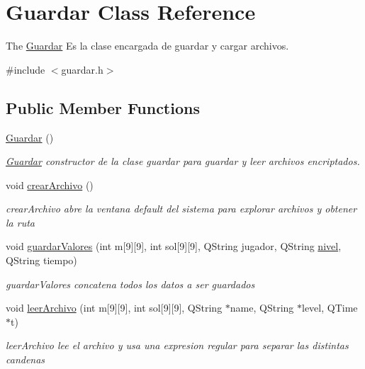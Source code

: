 \hypertarget{class_guardar}{\section{Guardar Class Reference}
\label{class_guardar}
}


The \hyperlink{class_guardar}{Guardar} Es la clase encargada de guardar y cargar archivos.  




{\ttfamily \#include $<$guardar.\-h$>$}

\subsection*{Public Member Functions}
\begin{DoxyCompactItemize}
\item 
\hypertarget{class_guardar_a265efa37b91672b6040a27f2207192b7}{\hyperlink{class_guardar_a265efa37b91672b6040a27f2207192b7}{Guardar} ()}\label{class_guardar_a265efa37b91672b6040a27f2207192b7}

\begin{DoxyCompactList}\small\item\em \hyperlink{class_guardar}{Guardar} constructor de la clase guardar para guardar y leer archivos encriptados. \end{DoxyCompactList}\item 
\hypertarget{class_guardar_aa602d00edb44609652777954ad2f8c18}{void \hyperlink{class_guardar_aa602d00edb44609652777954ad2f8c18}{crear\-Archivo} ()}\label{class_guardar_aa602d00edb44609652777954ad2f8c18}

\begin{DoxyCompactList}\small\item\em crear\-Archivo abre la ventana default del sistema para explorar archivos y obtener la ruta \end{DoxyCompactList}\item 
void \hyperlink{class_guardar_ab2a0427431816fd0c1138afb7410856c}{guardar\-Valores} (int m\mbox{[}9\mbox{]}\mbox{[}9\mbox{]}, int sol\mbox{[}9\mbox{]}\mbox{[}9\mbox{]}, Q\-String jugador, Q\-String \hyperlink{classnivel}{nivel}, Q\-String tiempo)
\begin{DoxyCompactList}\small\item\em guardar\-Valores concatena todos los datos a ser guardados \end{DoxyCompactList}\item 
void \hyperlink{class_guardar_ad1893652f3dad094f002e8415b20b67e}{leer\-Archivo} (int m\mbox{[}9\mbox{]}\mbox{[}9\mbox{]}, int sol\mbox{[}9\mbox{]}\mbox{[}9\mbox{]}, Q\-String $\ast$name, Q\-String $\ast$level, Q\-Time $\ast$t)
\begin{DoxyCompactList}\small\item\em leer\-Archivo lee el archivo y usa una expresion regular para separar las distintas candenas \end{DoxyCompactList}\end{DoxyCompactItemize}


